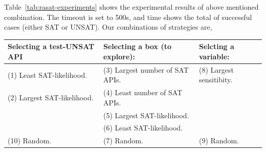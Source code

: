\documentclass[runningheads,a4paper,oribibl]{llncs}
\begin{document}
\begin{table}
\begin{center}
\end{center}
\caption{Options for Incremental Strategies} 
\label{tab:incremental}
\end{table}

Table~\ref{tab:rasat-experiments} shows the experimental results of above mentioned combination. 
The timeout is set to 500s, and time shows the total of successful cases 
(either SAT or UNSAT). Our combinations of strategies are,

\medskip
{\centering
\begin{tabular}{l|l|l}
Selecting a test-UNSAT API~~ & Selecting a box (to explore): & 
Selcting a variable: \\  %
\hline

(1) Least SAT-likelihood. & 
(3) Largest number of SAT APIs.~~ & 
(8) Largest sensitibity. \\

(2) Largest SAT-likelihood. & 
(4) Least number of SAT APIs. & \\

& (5) Largest SAT-likelihood. & \\

& (6) Least SAT-likelihood. & \\

(10) Random. & (7) Random. & (9) Random. \\
\end{tabular}
}
\medskip
\end{document}
